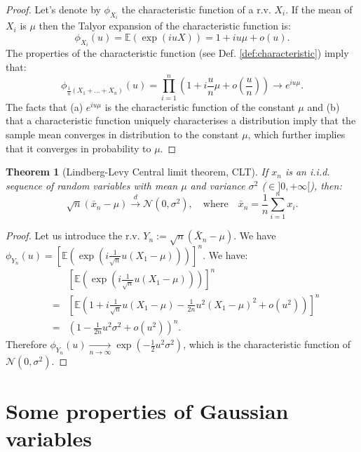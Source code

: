\documentclass[
  12pt,
]{book}
\newtheorem{theorem}{Theorem}[chapter]
\theoremstyle{definition}
\theoremstyle{definition}
\theoremstyle{definition}
\theoremstyle{definition}
\theoremstyle{remark}
\begin{document}
\begin{proof}
Let's denote by \(\phi_{X_i}\) the characteristic function of a r.v. \(X_i\). If the mean of \(X_i\) is \(\mu\) then the Talyor expansion of the characteristic function is:
\[
\phi_{X_i}(u) = \mathbb{E}(\exp(iuX)) = 1 + iu\mu + o(u).
\]
The properties of the characteristic function (see Def. \ref{def:characteristic}) imply that:
\[
\phi_{\frac{1}{n}(X_1+\dots+X_n)}(u) = \prod_{i=1}^{n} \left(1 + i\frac{u}{n}\mu + o\left(\frac{u}{n}\right) \right) \rightarrow e^{iu\mu}.
\]
The facts that (a) \(e^{iu\mu}\) is the characteristic function of the constant \(\mu\) and (b) that a characteristic function uniquely characterises a distribution imply that the sample mean converges in distribution to the constant \(\mu\), which further implies that it converges in probability to \(\mu\).
\end{proof}

\begin{theorem}[Lindberg-Levy Central limit theorem, CLT]
\protect\hypertarget{thm:LindbergLevyCLT}{}\label{thm:LindbergLevyCLT}If \(x_n\) is an i.i.d. sequence of random variables with mean \(\mu\) and variance \(\sigma^2\) (\(\in ]0,+\infty[\)), then:
\[
\boxed{\sqrt{n} (\bar{x}_n - \mu) \overset{d}{\rightarrow} \mathcal{N}(0,\sigma^2), \quad \mbox{where} \quad \bar{x}_n = \frac{1}{n} \sum_{i=1}^{n} x_i.}
\]
\end{theorem}

\begin{proof}
Let us introduce the r.v. \(Y_n:= \sqrt{n}(\bar{X}_n - \mu)\). We have \(\phi_{Y_n}(u) = \left[ \mathbb{E}\left( \exp(i \frac{1}{\sqrt{n}} u (X_1 - \mu)) \right) \right]^n\). We have:
\begin{eqnarray*}
&&\left[ \mathbb{E}\left( \exp\left(i \frac{1}{\sqrt{n}} u (X_1 - \mu)\right) \right) \right]^n\\
&=& \left[ \mathbb{E}\left( 1 + i \frac{1}{\sqrt{n}} u (X_1 - \mu) - \frac{1}{2n} u^2 (X_1 - \mu)^2 + o(u^2) \right) \right]^n \\
&=& \left( 1 - \frac{1}{2n}u^2\sigma^2 + o(u^2)\right)^n.
\end{eqnarray*}
Therefore \(\phi_{Y_n}(u) \underset{n \rightarrow \infty}{\rightarrow} \exp \left( - \frac{1}{2}u^2\sigma^2 \right)\), which is the characteristic function of \(\mathcal{N}(0,\sigma^2)\).
\end{proof}

\hypertarget{GaussianVar}{%
\section{Some properties of Gaussian variables}\label{GaussianVar}}
\end{document}

